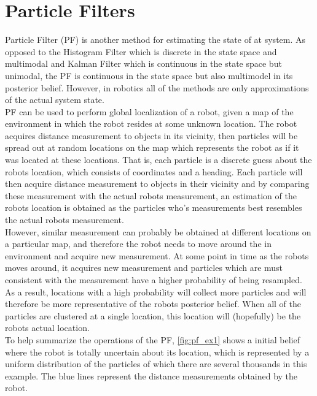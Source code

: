
\section{Particle Filters}

Particle Filter (PF) is another method for estimating the state of at system. As opposed to the Histogram Filter which is discrete in the state space and multimodal and Kalman Filter which is continuous in the state space but unimodal, the PF is continuous in the state space but also multimodel in its posterior belief. However, in robotics all of the methods are only approximations of the actual system state.\\

PF can be used to perform global localization of a robot, given a map of the environment in which the robot resides at some unknown location. The robot acquires distance measurement to objects in its vicinity, then particles will be spread out at random locations on the map which represents the robot as if it was located at these locations. That is, each particle is a discrete guess about the robots location, which consists of coordinates and a heading. Each particle will then acquire distance measurement to objects in their vicinity and by comparing these measurement with the actual robots measurement, an estimation of the robots location is obtained as the particles who's measurements best resembles the actual robots measurement.\\
However, similar measurement can probably be obtained at different locations on a particular map, and therefore the robot needs to move around the in environment and acquire new measurement. At some point in time as the robots moves around, it acquires new measurement and particles which are must consistent with the measurement have a higher probability of being resampled. As a result, locations with a high probability will collect more particles and will therefore be more representative of the robots posterior belief. When all of the particles are clustered at a single location, this location will (hopefully) be the robots actual location.\\

To help summarize the operations of the PF, \autoref{fig:pf_ex1} shows a initial belief where the robot is totally uncertain about its location, which is represented by a uniform distribution of the particles of which there are several thousands in this example. The blue lines represent the distance measurements obtained by the robot.

